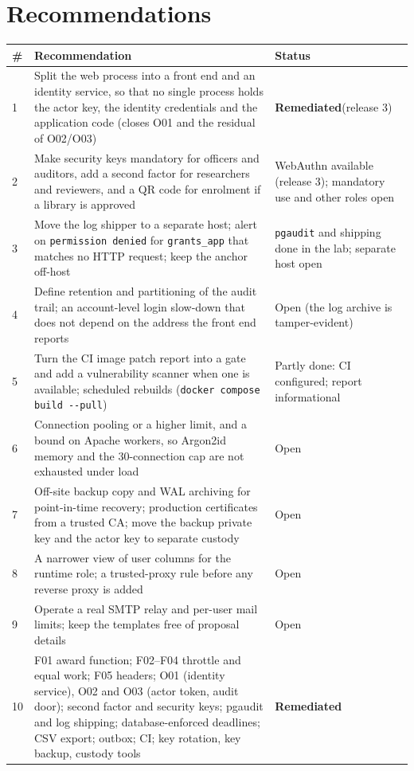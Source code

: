 \documentclass[10pt,a4paper]{article}
\newcommand{\code}[1]{\nolinkurl{#1}}
\newcommand{\fixed}{\textcolor{okgreen}{\textbf{Remediated}}}
\newcommand{\tcap}[1]{\captionof{table}{#1}\nopagebreak[4]\vspace{-3pt}}
\begin{document}
\section{Recommendations}\label{sec:recs}
\tcap{Recommendations}
\begin{center}\small
\begin{longtable}{@{}L{0.70cm}L{11.65cm}L{2.51cm}@{}}
\toprule\textbf{\#} & \textbf{Recommendation} & \textbf{Status}\\\midrule{} & Split the web process into a front end and an identity service, so that no single process holds the actor key, the identity credentials and the application code (closes O01 and the residual of O02/O03) & \fixed (release 3)\\
2 & Make security keys mandatory for officers and auditors, add a second factor for researchers and reviewers, and a QR code for enrolment if a library is approved & WebAuthn available (release 3); mandatory use and other roles open\\
3 & Move the log shipper to a separate host; alert on \code{permission denied} for \code{grants_app} that matches no HTTP request; keep the anchor off-host & \code{pgaudit} and shipping done in the lab; separate host open\\
4 & Define retention and partitioning of the audit trail; an account-level login slow-down that does not depend on the address the front end reports & Open (the log archive is tamper-evident)\\
5 & Turn the CI image patch report into a gate and add a vulnerability scanner when one is available; scheduled rebuilds (\code{docker compose build --pull}) & Partly done: CI configured; report informational\\
6 & Connection pooling or a higher limit, and a bound on Apache workers, so Argon2id memory and the 30-connection cap are not exhausted under load & Open\\
7 & Off-site backup copy and WAL archiving for point-in-time recovery; production certificates from a trusted CA; move the backup private key and the actor key to separate custody & Open\\
8 & A narrower view of user columns for the runtime role; a trusted-proxy rule before any reverse proxy is added & Open\\
9 & Operate a real SMTP relay and per-user mail limits; keep the templates free of proposal details & Open\\
10 & F01 award function; F02--F04 throttle and equal work; F05 headers; O01 (identity service), O02 and O03 (actor token, audit door); second factor and security keys; pgaudit and log shipping; database-enforced deadlines; CSV export; outbox; CI; key rotation, key backup, custody tools & \fixed\\
\bottomrule\end{longtable}\end{center}
\end{document}
